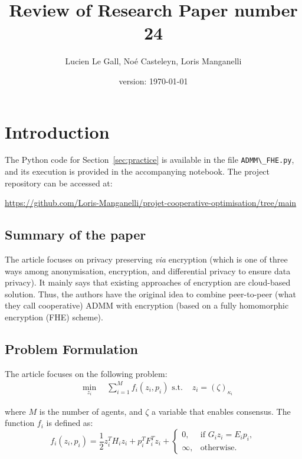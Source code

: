 \documentclass[10pt,english]{article}
\title{Review of Research Paper number 24}
\date{version: \today}%
\author{Lucien Le Gall, Noé Casteleyn, Loris Manganelli}
\begin{document}
\maketitle

\section{Introduction}

The Python code for Section~\ref{sec:practice} is available in the file \lstinline{ADMM\_FHE.py}, and its execution is provided in the accompanying notebook. The project repository can be accessed at:

\begin{center}
\url{https://github.com/Loris-Manganelli/projet-cooperative-optimisation/tree/main}
\end{center}

\subsection{Summary of the paper}


The article \cite{Binfet_2023} focuses on privacy preserving \textit{via} encryption (which is one of three ways
among anonymisation, encryption, and differential privacy to ensure data privacy). It mainly says that existing approaches of encryption
are cloud-based solution. Thus, the authors have the original idea to combine peer-to-peer (what they call cooperative)
ADMM with encryption (based on a fully homomorphic encryption (FHE) scheme).

\subsection{Problem Formulation}
The article focuses on the following problem:
\begin{equation*}
\begin{aligned}
& \min_{z_i} \quad 
\sum_{i=1}^M f_i(z_i,p_i)
\text{ s.t. }& z_i=(\zeta)_{\kappa_i}
\end{aligned}
\end{equation*}

where $M$ is the number of agents, and $\zeta$ a variable that enables consensus. The function $f_i$ is defined as:
\begin{equation}
f_i(z_i, p_i) =
\frac{1}{2} z_i^T H_i z_i + p_i^T F_i^T z_i +
\begin{cases}
0, & \text{if } G_i z_i = E_i p_i,\\
\infty, & \text{otherwise.}
\end{cases}
\end{equation}
\end{document}
